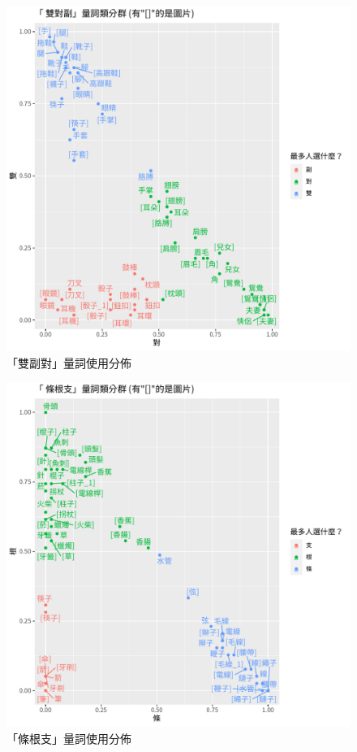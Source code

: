 \documentclass[10pt,a4paper]{article}
\begin{document}
\begin{figure}[h] %
	\centering
	\includegraphics[width=1.2\textwidth]{../plot_1}
	\caption{「雙副對」量詞使用分佈}
	\label{two}
\end{figure}

\begin{figure}[h] %
	\centering
	\includegraphics[width=1.2\textwidth]{../plot_2}
	\caption{「條根支」量詞使用分佈}
	\label{stick}
\end{figure}
\end{document}
